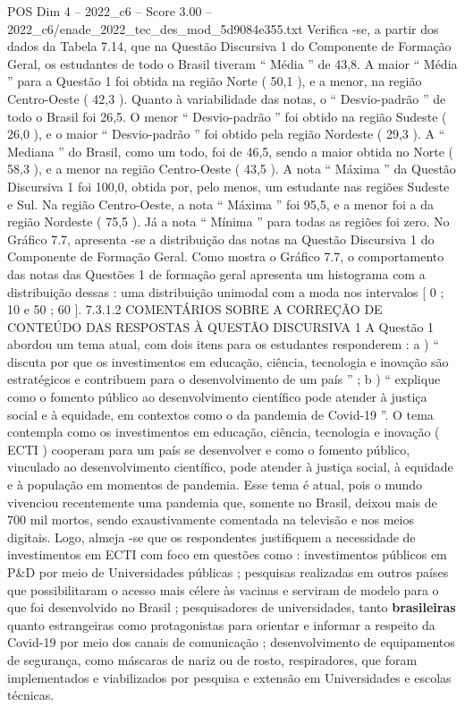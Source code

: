 \begin{textsample}{POS Dim 4 – 2022\_c6 – Score 3.00 – 2022\_c6/enade\_2022\_tec\_des\_mod\_5d9084e355.txt}
Verifica -se, a partir dos dados da Tabela 7.14, que na Questão Discursiva 1 do Componente de Formação Geral, os estudantes de todo o Brasil tiveram “ Média ” de 43,8.
A maior “ Média ” para a Questão 1 foi obtida na região Norte ( 50,1 ), e a menor, na região Centro-Oeste ( 42,3 ).
Quanto à variabilidade das notas, o “ Desvio-padrão ” de todo o Brasil foi 26,5.
O menor “ Desvio-padrão ” foi obtido na região Sudeste ( 26,0 ), e o maior “ Desvio-padrão ” foi obtido pela região Nordeste ( 29,3 ).
A “ Mediana ” do Brasil, como um todo, foi de 46,5, sendo a maior obtida no Norte ( 58,3 ), e a menor na região Centro-Oeste ( 43,5 ).
A nota “ Máxima ” da Questão Discursiva 1 foi 100,0, obtida por, pelo menos, um estudante nas regiões Sudeste e Sul.
Na região Centro-Oeste, a nota “ Máxima ” foi 95,5, e a menor foi a da região Nordeste ( 75,5 ).
Já a nota “ Mínima ” para todas as regiões foi zero.
No Gráfico 7.7, apresenta -se a distribuição das notas na Questão Discursiva 1 do Componente de Formação Geral.
Como mostra o Gráfico 7.7, o comportamento das notas das Questões 1 de formação geral apresenta um histograma com a distribuição dessas : uma distribuição unimodal com a moda nos intervalos [ 0 ; 10 e 50 ; 60 ]. 7.3.1.2 COMENTÁRIOS SOBRE A CORREÇÃO DE CONTEÚDO DAS RESPOSTAS À QUESTÃO DISCURSIVA 1 A Questão 1 abordou um tema atual, com dois itens para os estudantes responderem : a ) “ discuta por que os investimentos em educação, ciência, tecnologia e inovação são estratégicos e contribuem para o desenvolvimento de um país ” ; b ) “ explique como o fomento público ao desenvolvimento científico pode atender à justiça social e à equidade, em contextos como o da pandemia de Covid-19 ”.
O tema contempla como os investimentos em educação, ciência, tecnologia e inovação ( ECTI ) cooperam para um país se desenvolver e como o fomento público, vinculado ao desenvolvimento científico, pode atender à justiça social, à equidade e à população em momentos de pandemia.
Esse tema é atual, pois o mundo vivenciou recentemente uma pandemia que, somente no Brasil, deixou mais de 700 mil mortos, sendo exaustivamente comentada na televisão e nos meios digitais.
Logo, almeja -se que os respondentes justifiquem a necessidade de investimentos em ECTI com foco em questões como : investimentos públicos em P\&D por meio de Universidades públicas ; pesquisas realizadas em outros países que possibilitaram o acesso mais célere às vacinas e serviram de modelo para o que foi desenvolvido no Brasil ; pesquisadores de universidades, tanto \textbf{brasileiras} quanto estrangeiras como protagonistas para orientar e informar a respeito da Covid-19 por meio dos canais de comunicação ; desenvolvimento de equipamentos de segurança, como máscaras de nariz ou de rosto, respiradores, que foram implementados e viabilizados por pesquisa e extensão em Universidades e escolas técnicas.

\end{textsample}
